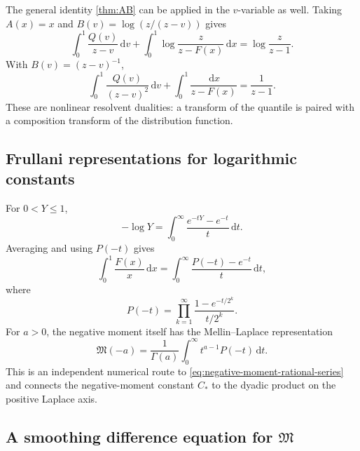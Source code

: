 \documentclass[11pt,oneside]{article}
\theoremstyle{definition}
\newcommand{\F}{F}
\newcommand{\Q}{Q}
\newcommand{\M}{\mathfrak M}
\newcommand{\dd}{\,\mathrm d}
\begin{document}
The general identity \cref{thm:AB} can be applied in the \(v\)-variable as well.  Taking
\(A(x)=x\) and
\(B(v)=\log(z/(z-v))\) gives
\begin{equation}\label{eq:inverse-log-resolvent}
 \int_0^1\frac{\Q(v)}{z-v}\dd v
 +\int_0^1\log\frac{z}{z-\F(x)}\dd x
 =\log\frac{z}{z-1}.
\end{equation}
With \(B(v)=(z-v)^{-1}\),
\begin{equation}\label{eq:inverse-square-resolvent}
 \int_0^1\frac{\Q(v)}{(z-v)^2}\dd v
 +\int_0^1\frac{\dd x}{z-\F(x)}
 =\frac1{z-1}.
\end{equation}
These are nonlinear resolvent dualities: a transform of the quantile is paired with a
composition transform of the distribution function.

\subsection{Frullani representations for logarithmic constants}

For \(0<Y\le1\),
\begin{equation}\label{eq:Frullani-log}
 -\log Y=\int_0^\infty\frac{e^{-tY}-e^{-t}}t\dd t.
\end{equation}
Averaging and using \(P(-t)\) gives
\begin{equation}\label{eq:log-Frullani-product}
 \int_0^1\frac{\F(x)}x\dd x
 =\int_0^\infty\frac{P(-t)-e^{-t}}t\dd t,
\end{equation}
where
\begin{equation}\label{eq:Pminus-product}
 P(-t)=\prod_{k=1}^{\infty}
 \frac{1-e^{-t/2^k}}{t/2^k}.
\end{equation}
For \(a>0\), the negative moment itself has the Mellin--Laplace representation
\begin{equation}\label{eq:negative-Mellin-Laplace}
 \M(-a)=\frac1{\Gamma(a)}\int_0^\infty t^{a-1}P(-t)\dd t.
\end{equation}
This is an independent numerical route to \cref{eq:negative-moment-rational-series} and
connects the negative-moment constant \(C_*\) to the dyadic product on the positive
Laplace axis.

\subsection{A smoothing difference equation for \texorpdfstring{\(\M\)}{M}}
\end{document}
